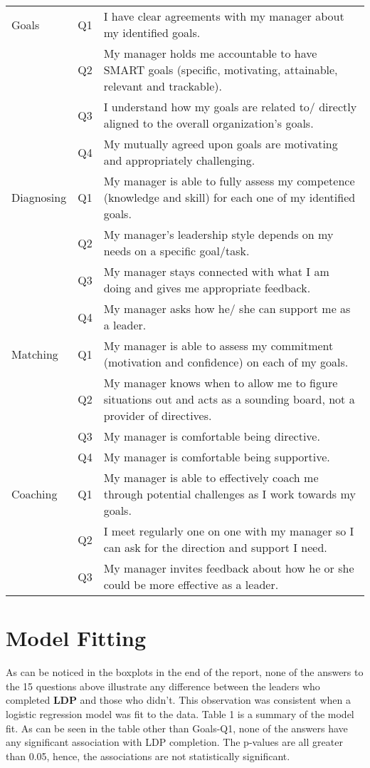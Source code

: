 \documentclass[11pt]{extarticle} %
\begin{document}
\begin{table}[H]
\centering
\begin{tabular}{l|c|p{5in}}
\hline
Goals 		& Q1 & I have clear agreements with my manager about my identified goals. \\
      		& Q2 & My manager holds me accountable to have SMART goals (specific, motivating, attainable, relevant and trackable). \\
      		& Q3 & I understand how my goals are related to/ directly aligned to the overall organization’s goals. \\
		& Q4 & My mutually agreed upon goals are motivating and appropriately challenging. \\
\hline
Diagnosing	& Q1 & My manager is able to fully assess my competence (knowledge and skill) for each one of my identified goals. \\
		& Q2 & My manager’s leadership style depends on my needs on a specific goal/task. \\
		& Q3 & My manager stays connected with what I am doing and gives me appropriate feedback. \\
		& Q4 & My manager asks how he/ she can support me as a leader.\\
\hline
Matching	& Q1 & My manager is able to assess my commitment (motivation and confidence) on each of my goals. \\
		& Q2 & My manager knows when to allow me to figure situations out and acts as a sounding board, not a provider of directives. \\
		& Q3 & My manager is comfortable being directive. \\
		& Q4 & My manager is comfortable being supportive. \\
\hline
Coaching	& Q1 & My manager is able to effectively coach me through potential challenges as I work towards my goals. \\
		& Q2 & I meet regularly one on one with my manager so I can ask for the direction and support I need. \\
		& Q3 & My manager invites feedback about how he or she could be more effective as a leader. \\
\hline
\end{tabular}
\end{table}

\section*{Model Fitting}
As can be noticed in the boxplots in the end of the report, none of the answers to the 15 questions above illustrate any difference between the leaders who completed {\bf{LDP}} and those who didn't. This observation was consistent when a logistic regression model was fit to the data. Table 1 is a summary of the model fit. As can be seen in the table other than Goals-Q1, none of the answers have any significant association with LDP completion. The p-values are all greater than 0.05, hence, the associations are not statistically significant. 
\end{document}
